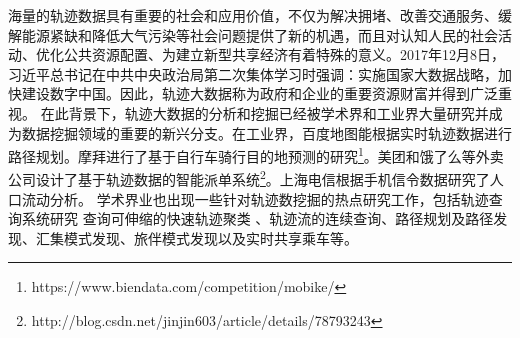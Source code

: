          海量的轨迹数据具有重要的社会和应用价值，不仅为解决拥堵、改善交通服务、缓解能源紧缺和降低大气污染等社会问题提供了新的机遇，而且对认知人民的社会活动、优化公共资源配置、为建立新型共享经济有着特殊的意义。2017年12月8日，习近平总书记在中共中央政治局第二次集体学习时强调：实施国家大数据战略，加快建设数字中国。因此，轨迹大数据称为政府和企业的重要资源财富并得到广泛重视。
         在此背景下，轨迹大数据的分析和挖掘已经被学术界和工业界大量研究并成为数据挖掘领域的重要的新兴分支。在工业界，百度地图能根据实时轨迹数据进行路径规划。摩拜进行了基于自行车骑行目的地预测的研究\footnote{https://www.biendata.com/competition/mobike/}。美团和饿了么等外卖公司设计了基于轨迹数据的智能派单系统\footnote{http://blog.csdn.net/jinjin603/article/details/78793243}。上海电信根据手机信令数据研究了人口流动分析\cite{BT}。
         学术界业也出现一些针对轨迹数挖掘的热点研究工作，包括轨迹查询系统研究\cite{SharkDB,TanLN12,TrajSpark,trajectoryVLDB}
         查询可伸缩的快速轨迹聚类 \cite{DengHZHD15,CostaMM14,YuWWWH13,MaoSJZZ16}、轨迹流的连续查询\cite{NehmeR06}、路径规划及路径发现\cite{SacharidisPTKPMS08}、汇集模式发现\cite{ZhengZYS13}、旅伴模式发现\cite{TangZYHLHP12,LiCJT13}以及实时共享乘车\cite{DuanJWZY16}等。 
         
